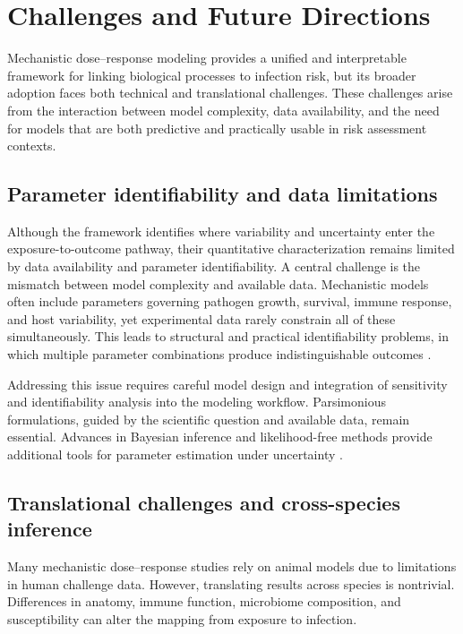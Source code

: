 \documentclass[11pt]{article}
\begin{document}
\section{Challenges and Future Directions} %
\label{sec:challenges_future}

Mechanistic dose--response modeling provides a unified and interpretable framework for linking biological processes to infection risk, but its broader adoption faces both technical and translational challenges. These challenges arise from the interaction between model complexity, data availability, and the need for models that are both predictive and practically usable in risk assessment contexts.

\subsection{Parameter identifiability and data limitations}

Although the framework identifies where variability and uncertainty enter the
exposure-to-outcome pathway, their quantitative characterization remains
limited by data availability and parameter identifiability. A central challenge is the mismatch between model complexity and available data. Mechanistic models often include parameters governing pathogen growth, survival, immune response, and host variability, yet experimental data rarely constrain all of these simultaneously. This leads to structural and practical identifiability problems, in which multiple parameter combinations produce indistinguishable outcomes \cite{Liyanage2024Identifiability, Miao2010Identifiability,Raue2009StructuralIdentifiability,Villaverde2019Observability}. 

Addressing this issue requires careful model design and integration of sensitivity and identifiability analysis into the modeling workflow. Parsimonious formulations, guided by the scientific question and available data, remain essential. Advances in Bayesian inference and likelihood-free methods provide additional tools for parameter estimation under uncertainty \cite{Sunnaker2013ABCReview,Toni2009ABC}.

\subsection{Translational challenges and cross-species inference}

Many mechanistic dose--response studies rely on animal models due to limitations in human challenge data. However, translating results across species is nontrivial. Differences in anatomy, immune function, microbiome composition, and susceptibility can alter the mapping from exposure to infection.
\end{document}
